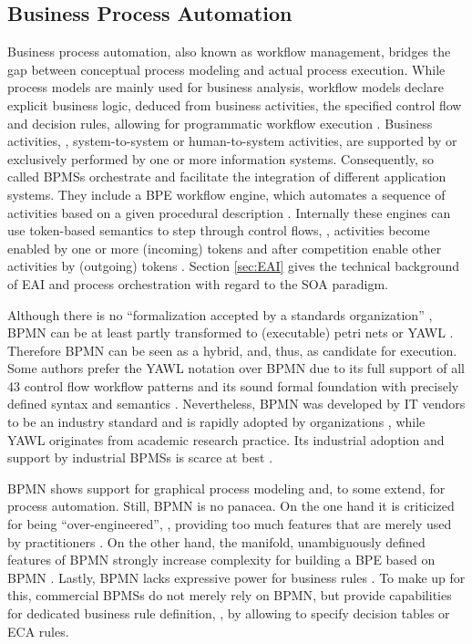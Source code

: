 \subsection{Business Process Automation}\label{sec:BPA}
Business process automation, also known as workflow management, bridges the gap between conceptual process modeling and actual process execution. While process models are mainly used for business analysis, workflow models declare explicit business logic, deduced from business activities, the specified control flow and decision rules, allowing for programmatic workflow execution \citep[]{VanDerAalst1998}. Business activities, \ie, system-to-system or human-to-system activities, are supported by or exclusively performed by one or more information systems. Consequently, so called \acp{BPMS} orchestrate and facilitate the integration of different application systems. They include a \ac{BPE} \resp workflow engine, which automates a sequence of activities based on a given procedural description \citep[]{VanDerAalst1998}. Internally these engines can use token-based semantics to step through control flows, \ie, activities become enabled by one or more (incoming) tokens and after competition enable other activities by (outgoing) tokens \citep[]{vanDerAalst2014}. Section \ref{sec:EAI} gives the technical background of \ac{EAI} and process orchestration with regard to the \ac{SOA} paradigm.

Although there is no \enquote{formalization accepted by a standards organization} \citep[]{vanDerAalst2010}, \ac{BPMN} can be at least partly transformed to (executable) petri nets \citep[]{Kossak2014} or \ac{YAWL} \citep[]{vanDerAalst2010}. Therefore \ac{BPMN} can be seen as a hybrid, and, thus, as candidate for execution. Some authors prefer the \ac{YAWL} notation over \ac{BPMN} due to its full support of all 43 control flow  workflow patterns \citep{Databases2003} and its sound formal foundation with precisely defined syntax and semantics \citep[]{Kossak2014}. Nevertheless, \ac{BPMN} was developed by IT vendors to be an industry standard and is rapidly adopted by organizations \citep[]{Recker2010}, while \ac{YAWL} originates from academic research practice. Its industrial adoption and support by industrial \acp{BPMS} is scarce at best \citep{YAWL2014}.

\ac{BPMN} shows support for graphical process modeling and, to some extend, for process automation. Still, \ac{BPMN} is no panacea. On the one hand it is criticized for being \enquote{over-engineered}, \ie, providing too much features that are merely used by practitioners \citep[]{Recker2010}. On the other hand, the manifold, unambiguously defined features of \ac{BPMN} strongly increase complexity for building a \ac{BPE} based on \ac{BPMN} \citep[]{Balko2015a}. Lastly, \ac{BPMN} lacks expressive power for business rules \citep[]{Recker2010}. To make up for this, commercial \acp{BPMS} do not merely rely on \ac{BPMN}, but provide capabilities for dedicated business rule definition, \eg, by allowing to specify decision tables or \ac{ECA} rules.

